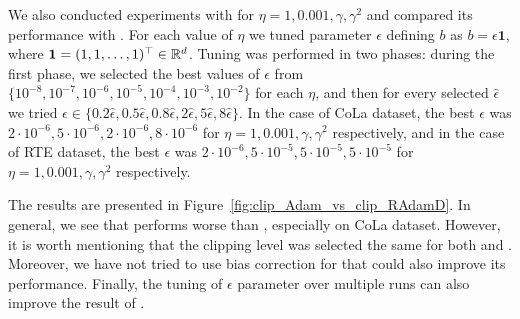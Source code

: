 \documentclass{article}
\begin{document}
We also conducted experiments with  for $\eta = 1, 0.001, \gamma, \gamma^2$ and compared its performance with . For each value of $\eta$ we tuned parameter $\epsilon$ defining $b$ as $b = \epsilon \bm{1}$, where $\bm{1} = (1,1,\ldots, 1)^\top \in {\mathbb R}^d$. Tuning was performed in two phases: during the first phase, we selected the best values of $\epsilon$ from $\{10^{-8}, 10^{-7}, 10^{-6}, 10^{-5}, 10^{-4}, 10^{-3}, 10^{-2}\}$ for each $\eta$, and then for every selected $\hat\epsilon$ we tried $\epsilon \in \{0.2\hat\epsilon, 0.5\hat\epsilon, 0.8\hat\epsilon, 2\hat\epsilon, 5\hat\epsilon, 8\hat\epsilon\}$. In the case of CoLa dataset, the best $\epsilon$ was $2 \cdot 10^{-6}, 5\cdot 10^{-6}, 2 \cdot 10^{-6}, 8 \cdot 10^{-6}$ for $\eta = 1, 0.001, \gamma, \gamma^2$ respectively, and in the case of RTE dataset, the best $\epsilon$ was $2 \cdot 10^{-6}, 5\cdot 10^{-5}, 5 \cdot 10^{-5}, 5 \cdot 10^{-5}$ for $\eta = 1, 0.001, \gamma, \gamma^2$ respectively.

The results are presented in Figure~\ref{fig:clip_Adam_vs_clip_RAdamD}. In general, we see that  performs worse than , especially on CoLa dataset. However, it is worth mentioning that the clipping level was selected the same for both  and . Moreover, we have not tried to use bias correction for  that could also improve its performance. Finally, the tuning of $\epsilon$ parameter over multiple runs can also improve the result of .
\end{document}
